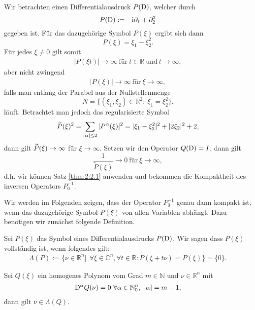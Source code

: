 \begin{exa}
Wir betrachten einen Differentialausdruck $P(\mathrm D)$, welcher durch
\begin{equation}
P(\mathrm D) := -\mathrm i\partial_1 + \partial_2^2
\end{equation}
gegeben ist. Für das dazugehörige Symbol $P(\xi)$ ergibt sich dann
\begin{equation}
P(\xi) = \xi_1 - \xi_2^2.
\end{equation}
Für jedes $\xi \not = 0$ gilt somit
\begin{align}
|P(\xi t)| \rightarrow \infty \ \text{für} \ t\in \mathbb{R} \ \text{und} \ t \rightarrow \infty,
\end{align}
aber nicht zwingend
\begin{align}
|P(\xi)| \rightarrow \infty \ \text{für} \ \xi \rightarrow \infty,
\end{align}
falls man entlang der Parabel aus der Nullstellenmenge\begin{equation}
N= \{ (\xi_1,\xi_2)\in \mathbb{R}^2 : \ \xi_1 = \xi_2^2 \}.
\end{equation}
läuft. Betrachtet man jedoch das regularisierte Symbol
\begin{equation}
\widetilde{P}(\xi)^2 = \sum_{|\alpha| \leq 2} |P^{\alpha}(\xi)|^2 = |\xi_1 - \xi_2^2|^2 + |2\xi_2|^2 + 2,
\end{equation}
dann gilt $\widetilde{P}(\xi) \rightarrow \infty$ für $\xi \rightarrow \infty$. Setzen wir den Operator $Q(\mathrm D)=I$, dann gilt
\begin{equation}
\frac{1}{\tilde{P}(\xi)} \rightarrow 0 \ \text{für} \ \xi \rightarrow \infty,
\end{equation}
d.h. wir können Satz \ref{thm:2:2.1} anwenden und bekommen die Kompaktheit des inversen Operators $P_0^{-1}$.
\end{exa}
Wir werden im Folgenden zeigen, dass der Operator $P_0^{-1}$ genau dann kompakt ist, wenn das dazugehörige Symbol $P(\xi)$ von allen Variablen abhängt. Dazu benötigen wir zunächst folgende Definition.
\begin{df}
Sei $P(\xi)$ das Symbol eines Differentialausdrucks $P(\mathrm D)$. Wir sagen dass $P(\xi)$ vollständig ist, wenn folgendes gilt:
\begin{align*}
\Lambda(P):=\{ \nu \in \mathbb{R}^n| \ \ \forall \xi \in \mathbb{C}^n, \forall t \in \mathbb{R}: P(\xi + t\nu) = P(\xi)  \} = \{0\}.
\end{align*}
\end{df}
\begin{lem}\label{Lema:homogene Polynome} Sei $Q(\xi)$ ein homogenes Polynom vom Grad $m \in \mathbb{N}$ und  $\nu \in \mathbb{R}^n$ mit
\begin{align*}
\mathrm D^{\alpha}Q(\nu)=0 \ \forall \alpha \in \mathbb{N}_0^{n}, \ |\alpha| = m-1,
\end{align*}
dann gilt $\nu \in \Lambda(Q)$.
\end{lem}
